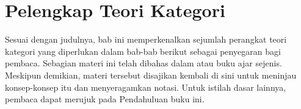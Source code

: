 
\chapter{Pelengkap Teori Kategori}\label{sec:categories}
\hypertarget{o014.aljabr2.chapter1.overview}{ }

Sesuai dengan judulnya, bab ini memperkenalkan sejumlah perangkat teori
kategori yang diperlukan dalam bab-bab berikut sebagai penyegaran bagi
pembaca. Sebagian materi ini telah dibahas dalam \cite{Li1} atau buku ajar
sejenis. Meskipun demikian, materi tersebut disajikan kembali di sini untuk
meninjau konsep-konsep itu dan menyeragamkan notasi. Untuk istilah dasar
lainnya, pembaca dapat merujuk pada Pendahuluan buku ini.

